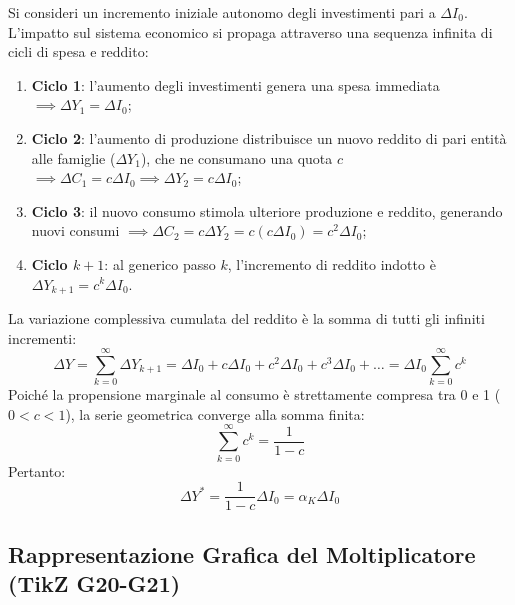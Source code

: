 \begin{dimostrazione}
Si consideri un incremento iniziale autonomo degli investimenti pari a $\Delta I_0$. L'impatto sul sistema economico si propaga attraverso una sequenza infinita di cicli di spesa e reddito:
\begin{enumerate}
    \item \textbf{Ciclo 1}: l'aumento degli investimenti genera una spesa immediata $\implies \Delta Y_1 = \Delta I_0$;
    \item \textbf{Ciclo 2}: l'aumento di produzione distribuisce un nuovo reddito di pari entità alle famiglie ($\Delta Y_1$), che ne consumano una quota $c$ $\implies \Delta C_1 = c \Delta I_0 \implies \Delta Y_2 = c \Delta I_0$;
    \item \textbf{Ciclo 3}: il nuovo consumo stimola ulteriore produzione e reddito, generando nuovi consumi $\implies \Delta C_2 = c \Delta Y_2 = c(c \Delta I_0) = c^2 \Delta I_0$;
    \item \textbf{Ciclo $k+1$}: al generico passo $k$, l'incremento di reddito indotto è $\Delta Y_{k+1} = c^k \Delta I_0$.
\end{enumerate}
La variazione complessiva cumulata del reddito è la somma di tutti gli infiniti incrementi:
\begin{equation}
    \Delta Y = \sum_{k=0}^{\infty} \Delta Y_{k+1} = \Delta I_0 + c \Delta I_0 + c^2 \Delta I_0 + c^3 \Delta I_0 + \dots = \Delta I_0 \sum_{k=0}^{\infty} c^k
\end{equation}
Poiché la propensione marginale al consumo è strettamente compresa tra 0 e 1 ($0 < c < 1$), la serie geometrica converge alla somma finita:
\begin{equation}
    \sum_{k=0}^{\infty} c^k = \frac{1}{1 - c}
\end{equation}
Pertanto:
\begin{equation}
    \Delta Y^* = \frac{1}{1 - c} \Delta I_0 = \alpha_K \Delta I_0
\end{equation}
\end{dimostrazione}

\subsection{Rappresentazione Grafica del Moltiplicatore (TikZ G20-G21)}

